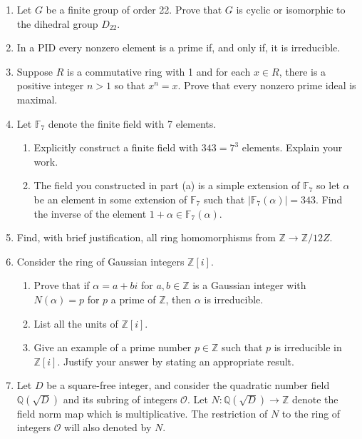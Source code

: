 \documentclass{report}
\newcommand\Q{{\mathbb Q}}
\newcommand\Z{{\mathbb Z}}
\newcommand\dsp{\displaystyle}
\newcommand\F{{\mathbb F}}
\begin{document}
\begin{enumerate}
\item Let $G$ be a finite group of order 22.  Prove that $G$ is cyclic or isomorphic to the 
dihedral group $D_{22}$.

\item In a PID every nonzero element is a prime if, and only if,
it is irreducible.

\item Suppose $R$ is a commutative ring with 1 and for each $x \in R$, there is a positive integer $n > 1$ so that
$x^n = x$.  Prove that every nonzero prime ideal is maximal.

\item  Let $\F_{7}$ denote the finite field with 7 elements.  

\begin{enumerate}

\item Explicitly construct a finite field with $343 = 7^3$ elements.  Explain your work.

\item The field you constructed in part (a) is a simple extension of $\F_{7}$ so let
$\alpha$ be an element in some extension of $\F_7$ such that
$\dsp \vert \F_{7} (\alpha) \vert = 343$.
Find the inverse of the element $1 + \alpha \in \F_{7} (\alpha)$.

\end{enumerate}

\item Find, with brief justification, all ring homomorphisms from $\Z \to \Z/12Z$.

\item Consider the ring of Gaussian integers $\Z[i]$.  

\begin{enumerate}

\item Prove that if $\alpha = a + b i$ for $a, b \in \Z$ is a Gaussian integer with $N(\alpha) = p$ for $p$ a 
prime of $\Z$, then $\alpha$ is irreducible.

\item List all the units of $\Z[i]$.

\item Give an example of a prime number $p \in \Z$ such that $p$ is irreducible in $\Z[i]$.
Justify your answer by stating an appropriate result.

\end{enumerate}

\item  Let $D$ be a square-free integer, and consider the quadratic number field $\Q (\sqrt{D})$ and its subring of integers
$\mathcal O$.  Let $N: \Q(\sqrt{D}) \to \Z$ denote the field norm map which is multiplicative.  The restriction of $N$ to
the ring of integers $\mathcal O$ will also denoted by $N$.


\end{enumerate}
\end{document}
